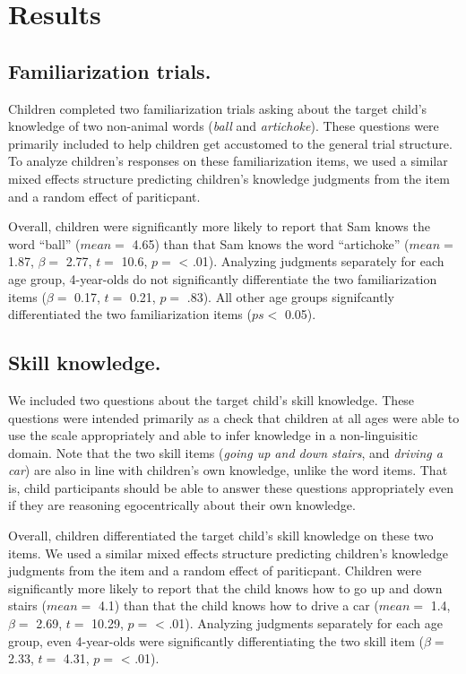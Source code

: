 \documentclass[10pt, letterpaper]{article}
\begin{document}
\hypertarget{results}{%
\section{Results}\label{results}}

\hypertarget{familiarization-trials.}{%
\subsection{Familiarization trials.}\label{familiarization-trials.}}

Children completed two familiarization trials asking about the target
child's knowledge of two non-animal words (\emph{ball} and
\emph{artichoke}). These questions were primarily included to help
children get accustomed to the general trial structure. To analyze
children's responses on these familiarization items, we used a similar
mixed effects structure predicting children's knowledge judgments from
the item and a random effect of pariticpant.

Overall, children were significantly more likely to report that Sam
knows the word ``ball'' (\(mean =\) 4.65) than that Sam knows the word
``artichoke'' (\(mean =\) 1.87, \(\beta =\) 2.77, \(t =\) 10.6, \(p =\)
\textless{} .01). Analyzing judgments separately for each age group,
4-year-olds do not significantly differentiate the two familiarization
items (\(\beta =\) 0.17, \(t =\) 0.21, \(p =\) .83). All other age
groups signifcantly differentiated the two familiarization items
(\(ps <\) 0.05).

\hypertarget{skill-knowledge.}{%
\subsection{Skill knowledge.}\label{skill-knowledge.}}

We included two questions about the target child's skill knowledge.
These questions were intended primarily as a check that children at all
ages were able to use the scale appropriately and able to infer
knowledge in a non-linguisitic domain. Note that the two skill items
(\emph{going up and down stairs}, and \emph{driving a car}) are also in
line with children's own knowledge, unlike the word items. That is,
child participants should be able to answer these questions
appropriately even if they are reasoning egocentrically about their own
knowledge.

Overall, children differentiated the target child's skill knowledge on
these two items. We used a similar mixed effects structure predicting
children's knowledge judgments from the item and a random effect of
pariticpant. Children were significantly more likely to report that the
child knows how to go up and down stairs (\(mean =\) 4.1) than that the
child knows how to drive a car (\(mean =\) 1.4, \(\beta =\) 2.69,
\(t =\) 10.29, \(p =\) \textless{} .01). Analyzing judgments separately
for each age group, even 4-year-olds were significantly differentiating
the two skill item (\(\beta =\) 2.33, \(t =\) 4.31, \(p =\) \textless{}
.01).
\end{document}
